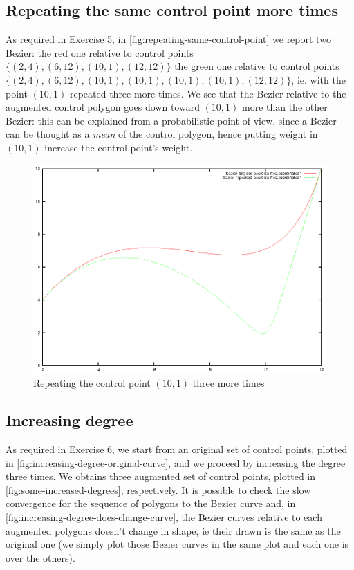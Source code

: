 \documentclass{article}
\begin{document}
\subsection{Repeating the same control point more times}
As required in Exercise 5, in
\autoref{fig:repeating-same-control-point} we report two Bezier: the
red one relative to control points $\{(2,4), (6,12), (10,1),
(12,12)\}$ the green one relative to control points $\{(2,4), (6,12),
(10,1), (10,1), (10,1), (10,1), (12,12)\}$, ie. with the point
$(10,1)$ repeated three more times. We see that the Bezier relative to
the augmented control polygon goes down toward $(10,1)$ more than the
other Bezier: this can be explained from a probabilistic point of
view, since a Bezier can be thought as a \emph{mean} of the control
polygon, hence putting weight in $(10,1)$ increase the control point's
weight.
\begin{figure}[h!]
  \centering
  \includegraphics{bezier-deCasteljau-curves/exercise-five}
  \caption{Repeating the control point $(10,1)$ three more times}
  \label{fig:repeating-same-control-point}
\end{figure}

\subsection{Increasing degree}
As required in Exercise 6, we start from an original set of control
points, plotted in \autoref{fig:increasing-degree-original-curve}, and
we proceed by increasing the degree three times. We obtains three
augmented set of control points, plotted in
\autoref{fig:some-increased-degrees}, respectively. It is possible to
check the slow convergence for the sequence of polygons to the Bezier
curve and, in \autoref{fig:increasing-degree-does-change-curve}, the
Bezier curves relative to each augmented polygons doesn't change in
shape, ie their drawn is the same as the original one (we simply plot
those Bezier curves in the same plot and each one is over the others).
\end{document}
